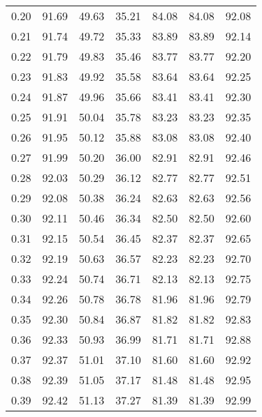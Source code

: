 \begin{tabular}{|c|c|c|c|c|c|c|}
      0.20 &     91.69 &     49.63 &      35.21 &   84.08 &      84.08 &         92.08 \\
      0.21 &     91.74 &     49.72 &      35.33 &   83.89 &      83.89 &         92.14 \\
      0.22 &     91.79 &     49.83 &      35.46 &   83.77 &      83.77 &         92.20 \\
      0.23 &     91.83 &     49.92 &      35.58 &   83.64 &      83.64 &         92.25 \\
      0.24 &     91.87 &     49.96 &      35.66 &   83.41 &      83.41 &         92.30 \\
      0.25 &     91.91 &     50.04 &      35.78 &   83.23 &      83.23 &         92.35 \\
      0.26 &     91.95 &     50.12 &      35.88 &   83.08 &      83.08 &         92.40 \\
      0.27 &     91.99 &     50.20 &      36.00 &   82.91 &      82.91 &         92.46 \\
      0.28 &     92.03 &     50.29 &      36.12 &   82.77 &      82.77 &         92.51 \\
      0.29 &     92.08 &     50.38 &      36.24 &   82.63 &      82.63 &         92.56 \\
      0.30 &     92.11 &     50.46 &      36.34 &   82.50 &      82.50 &         92.60 \\
      0.31 &     92.15 &     50.54 &      36.45 &   82.37 &      82.37 &         92.65 \\
      0.32 &     92.19 &     50.63 &      36.57 &   82.23 &      82.23 &         92.70 \\
      0.33 &     92.24 &     50.74 &      36.71 &   82.13 &      82.13 &         92.75 \\
      0.34 &     92.26 &     50.78 &      36.78 &   81.96 &      81.96 &         92.79 \\
      0.35 &     92.30 &     50.84 &      36.87 &   81.82 &      81.82 &         92.83 \\
      0.36 &     92.33 &     50.93 &      36.99 &   81.71 &      81.71 &         92.88 \\
      0.37 &     92.37 &     51.01 &      37.10 &   81.60 &      81.60 &         92.92 \\
      0.38 &     92.39 &     51.05 &      37.17 &   81.48 &      81.48 &         92.95 \\
      0.39 &     92.42 &     51.13 &      37.27 &   81.39 &      81.39 &         92.99 \\

\end{tabular}
